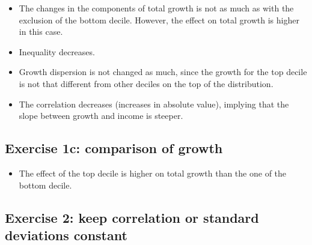 \documentclass{article}
\begin{document}
\begin{itemize}
    \item The changes in the components of total growth is not as much as with the exclusion of the bottom decile. However, the effect on total growth is higher in this case.
    \item Inequality decreases.
    \item Growth dispersion is not changed as much, since the growth for the top decile is not that different from other deciles on the top of the distribution.
    \item The correlation decreases (increases in absolute value), implying that the slope between growth and income is steeper.
\end{itemize}


\subsection*{Exercise 1c: comparison of growth}

\begin{figure}[H]
  \centering
  \hfill
  \caption*{}
\end{figure}

\begin{itemize}
    \item The effect of the top decile is higher on total growth than the one of the bottom decile.
\end{itemize}

\subsection*{Exercise 2: keep correlation or standard deviations constant}
\end{document}

